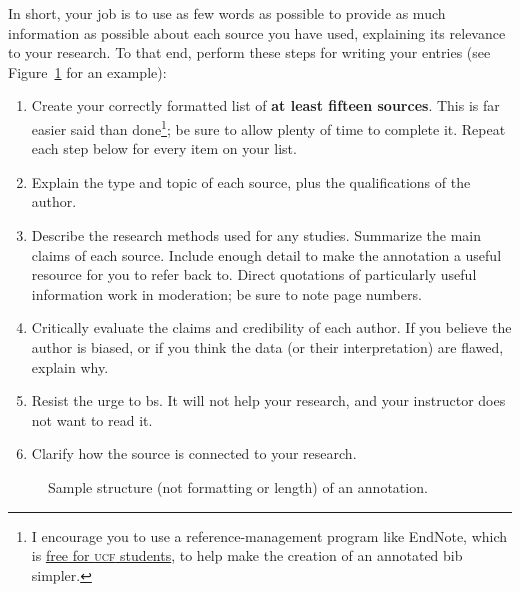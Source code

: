 \documentclass[11pt]{amsart}	%
\begin{document}
In short, your job is to use as few words as possible to provide as much information as possible about each source you have used, explaining its relevance to your research. To that end, perform these steps for writing your entries (see Figure~\ref{fig:sample-annotation-content} for an example):
\begin{enumerate}
	\item Create your correctly formatted list of \textbf{at least fifteen sources}. This is far easier said than done\footnote{I encourage you to use a reference-management program like EndNote, which is \href{http://guides.ucf.edu/citations-endnote}{free for \textsc{ucf} students}, to help make the creation of an annotated bib simpler.}; be sure to allow plenty of time to complete it. Repeat each step below for every item on your list.
	\item  Explain\label{step:source-id} the type and topic of each source, plus the qualifications of the author.
	\item  Describe the research methods used for any studies. Summarize the main claims of each source. Include enough detail to make the annotation a useful resource for you to refer back to. Direct quotations of particularly useful information work in moderation; be sure to note page numbers.
	\item  Critically evaluate the claims and credibility of each author. If you believe the author is biased, or if you think the data (or their interpretation) are flawed, explain why.
	\item  Resist the urge to bs. It will not help your research, and your instructor does not want to read it.
	\item  Clarify how the source is connected to your research.
\end{enumerate}


\begin{figure}[ht]	
	\centering
	\caption{Sample structure (not formatting or length) of an annotation.}
\label{fig:sample-annotation-content}
\end{figure} %
\end{document}
